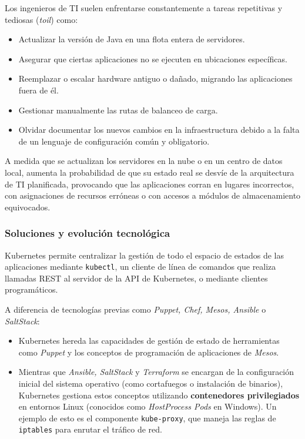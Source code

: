 Los ingenieros de TI suelen enfrentarse constantemente a tareas repetitivas y tediosas (\textit{toil}) como:
\begin{itemize}
    \item Actualizar la versión de Java en una flota entera de servidores.
    \item Asegurar que ciertas aplicaciones no se ejecuten en ubicaciones específicas.
    \item Reemplazar o escalar hardware antiguo o dañado, migrando las aplicaciones fuera de él.
    \item Gestionar manualmente las rutas de balanceo de carga.
    \item Olvidar documentar los nuevos cambios en la infraestructura debido a la falta de un lenguaje de configuración común y obligatorio.
\end{itemize}

A medida que se actualizan los servidores en la nube o en un centro de datos 
local, aumenta la probabilidad de que su estado real se desvíe de la arquitectura de TI planificada, provocando que las aplicaciones corran en lugares incorrectos, con asignaciones de recursos erróneas o con accesos a módulos de almacenamiento equivocados.

\subsubsection{Soluciones y evolución tecnológica}
Kubernetes permite centralizar la gestión de todo el espacio de estados de las
 aplicaciones mediante \texttt{kubectl}, un cliente de línea de comandos que realiza llamadas REST al servidor de la API de Kubernetes, o mediante clientes programáticos. 

A diferencia de tecnologías previas como \textit{Puppet, Chef, Mesos, Ansible} o \textit{SaltStack}:
\begin{itemize}
    \item Kubernetes hereda las capacidades de gestión de estado de herramientas como 
    \textit{Puppet} y los conceptos de programación de aplicaciones de \textit{Mesos}.
    \item Mientras que \textit{Ansible, SaltStack} y \textit{Terraform} se encargan de la 
    configuración inicial del sistema operativo (como cortafuegos o instalación de binarios), Kubernetes
     gestiona estos conceptos utilizando \textbf{contenedores privilegiados} en entornos Linux 
     (conocidos como \textit{HostProcess Pods} en Windows). Un ejemplo de esto es el componente 
     \texttt{kube-proxy}, que maneja las reglas de \texttt{iptables} para enrutar el tráfico de red.
\end{itemize}

